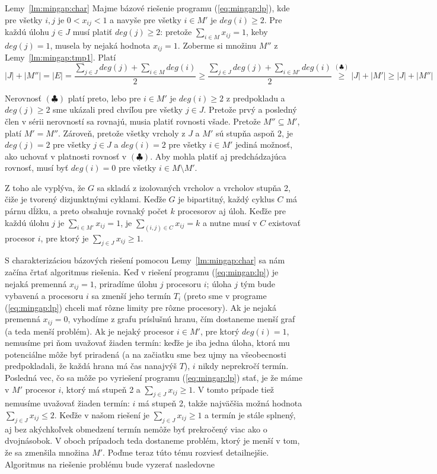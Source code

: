 \begin{dokazpar}{Lemy~\ref{lm:mingap:char}}
  Majme bázové riešenie programu (\ref{eq:mingap:lp}), kde pre všetky $i,j$ je $0<x_{ij}<1$ a navyše pre
  všetky $i\in M'$ je $deg(i)\ge2$. 
  Pre každú úlohu $j\in J$ musí platiť 
  $deg(j)\ge2$: pretože  $\sum_{i\in M}x_{ij}=1$, keby $deg(j)=1$, musela by nejaká hodnota $x_{ij}=1$.
  Zoberme si množinu $M''$ z Lemy~\ref{lm:mingap:tmp1}. Platí
  $$|J|+|M''|=|E|=\frac{\sum\limits_{j\in J}deg(j) + \sum\limits_{i\in M}deg(i)}{2}
  \ge\frac{\sum\limits_{j\in J}deg(j) + \sum\limits_{i\in M'}deg(i)}{2}
  \stackrel{(\clubsuit)}{\ge}|J|+|M'|\ge |J| + |M''|
  $$

  \noindent
  Nerovnosť $(\clubsuit)$ platí preto, lebo pre $i\in M'$ je $deg(i)\ge 2$ z 
  predpokladu a $deg(j)\ge 2$ sme ukázali pred chvíľou pre všetky $j\in J$.
  Pretože prvý a posledný člen v sérii nerovností sa rovnajú, musia platiť rovnosti všade. 
  Pretože $M''\subseteq M'$, platí $M'=M''$. Zároveň, pretože všetky vrcholy z $J$ a $M'$ sú stupňa aspoň 2, 
  je $deg(j)=2$ pre všetky $j\in J$ a  $deg(i)=2$ pre všetky $i\in M'$
  jediná možnosť, ako uchovať v platnosti rovnosť v $(\clubsuit)$.
  Aby mohla platiť aj predchádzajúca rovnosť, musí byť
  $deg(i)=0$ pre všetky $i\in M\setminus M'$.

  \noindent
  Z toho ale vyplýva, že $G$ sa skladá z izolovaných vrcholov a vrcholov stupňa 2, čiže je tvorený
  dizjunktnými cyklami. Keďže $G$ je bipartitný, každý cyklus $C$ má párnu dĺžku, a preto obsahuje rovnaký počet
  $k$
  procesorov aj úloh. Keďže pre každú úlohu $j$ je $\sum_{i\in M'}x_{ij}=1$, je $\sum_{(i,j)\in C}x_{ij}=k$
  a nutne musí v $C$ existovať procesor $i$, pre ktorý je $\sum_{j\in J}x_{ij}\ge1$.
\end{dokazpar}

\noindent
S charakterizáciou bázových riešení pomocou Lemy~\ref{lm:mingap:char} sa nám začína črtať algoritmus riešenia.
Keď v riešení programu (\ref{eq:mingap:lp}) je nejaká premenná $x_{ij}=1$, priradíme úlohu $j$ procesoru $i$;
úloha $j$ tým bude vybavená a procesoru $i$ sa zmenší jeho termín $T_i$ (preto sme v programe (\ref{eq:mingap:lp})
chceli mať rôzne limity pre rôzne procesory). Ak je nejaká premenná $x_{ij}=0$, vyhodíme z grafu príslušnú
hranu, čím dostaneme menší graf (a teda menší problém). Ak je nejaký procesor $i\in M'$, pre ktorý $deg(i)=1$,
nemusíme pri ňom uvažovať žiaden termín: keďže je iba jedna úloha, ktorá mu potenciálne môže byť priradená
(a na začiatku sme bez ujmy na všeobecnosti predpokladali, že každá hrana má čas nanajvýš $T$), $i$ nikdy neprekročí 
termín. Posledná vec, čo sa môže po vyriešení programu (\ref{eq:mingap:lp}) stať, je že máme v $M'$ procesor $i$,
ktorý má stupeň 2 a $\sum_{j\in J}x_{ij}\ge1$. V tomto prípade tiež nemusíme uvažovať žiaden termín:
$i$ má stupeň 2, takže najväčšia možná hodnota $\sum_{j\in J}x_{ij}\le2$. Keďže v našom riešení je 
$\sum_{j\in J}x_{ij}\ge1$ a termín je stále splnený, aj bez akýchkoľvek obmedzení  termín nemôže byť prekročený 
viac ako o dvojnásobok. V oboch prípadoch teda dostaneme problém, ktorý je menší v tom, že sa zmenšila
množina $M'$. Poďme teraz túto tému rozviesť detailnejšie.
Algoritmus na riešenie problému \mingap bude vyzerať nasledovne
\newpage

